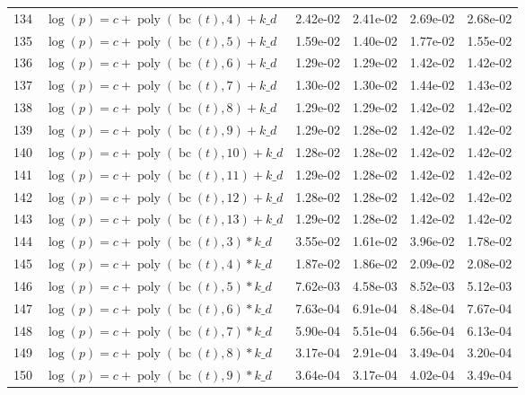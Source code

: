 \documentclass[12pt,a4paper]{article}
\DeclareMathOperator{\bc}{bc}
\DeclareMathOperator{\poly}{poly}
\begin{document}
\begin{longtable}[t]{ll>{\raggedleft\arraybackslash}p{2cm}>{\raggedleft\arraybackslash}p{2cm}>{\raggedleft\arraybackslash}p{2cm}>{\raggedleft\arraybackslash}p{2cm}}
134 & $\log(p) = c + \poly\left( \bc(t), 4 \right) + k\_d$ & 2.42e-02 & 2.41e-02 & 2.69e-02 & 2.68e-02\\
\rowcolor{gray!6}  135 & $\log(p) = c + \poly\left( \bc(t), 5 \right) + k\_d$ & 1.59e-02 & 1.40e-02 & 1.77e-02 & 1.55e-02\\
136 & $\log(p) = c + \poly\left( \bc(t), 6 \right) + k\_d$ & 1.29e-02 & 1.29e-02 & 1.42e-02 & 1.42e-02\\
\rowcolor{gray!6}  137 & $\log(p) = c + \poly\left( \bc(t), 7 \right) + k\_d$ & 1.30e-02 & 1.30e-02 & 1.44e-02 & 1.43e-02\\
138 & $\log(p) = c + \poly\left( \bc(t), 8 \right) + k\_d$ & 1.29e-02 & 1.29e-02 & 1.42e-02 & 1.42e-02\\
\rowcolor{gray!6}  139 & $\log(p) = c + \poly\left( \bc(t), 9 \right) + k\_d$ & 1.29e-02 & 1.28e-02 & 1.42e-02 & 1.42e-02\\
140 & $\log(p) = c + \poly\left( \bc(t), 10 \right) + k\_d$ & 1.28e-02 & 1.28e-02 & 1.42e-02 & 1.42e-02\\
\rowcolor{gray!6}  141 & $\log(p) = c + \poly\left( \bc(t), 11 \right) + k\_d$ & 1.29e-02 & 1.28e-02 & 1.42e-02 & 1.42e-02\\
142 & $\log(p) = c + \poly\left( \bc(t), 12 \right) + k\_d$ & 1.28e-02 & 1.28e-02 & 1.42e-02 & 1.42e-02\\
\rowcolor{gray!6}  143 & $\log(p) = c + \poly\left( \bc(t), 13 \right) + k\_d$ & 1.29e-02 & 1.28e-02 & 1.42e-02 & 1.42e-02\\
144 & $\log(p) = c + \poly\left( \bc(t), 3 \right) * k\_d$ & 3.55e-02 & 1.61e-02 & 3.96e-02 & 1.78e-02\\
\rowcolor{gray!6}  145 & $\log(p) = c + \poly\left( \bc(t), 4 \right) * k\_d$ & 1.87e-02 & 1.86e-02 & 2.09e-02 & 2.08e-02\\
146 & $\log(p) = c + \poly\left( \bc(t), 5 \right) * k\_d$ & 7.62e-03 & 4.58e-03 & 8.52e-03 & 5.12e-03\\
\rowcolor{gray!6}  147 & $\log(p) = c + \poly\left( \bc(t), 6 \right) * k\_d$ & 7.63e-04 & 6.91e-04 & 8.48e-04 & 7.67e-04\\
148 & $\log(p) = c + \poly\left( \bc(t), 7 \right) * k\_d$ & 5.90e-04 & 5.51e-04 & 6.56e-04 & 6.13e-04\\
\rowcolor{gray!6}  149 & $\log(p) = c + \poly\left( \bc(t), 8 \right) * k\_d$ & 3.17e-04 & 2.91e-04 & 3.49e-04 & 3.20e-04\\
150 & $\log(p) = c + \poly\left( \bc(t), 9 \right) * k\_d$ & 3.64e-04 & 3.17e-04 & 4.02e-04 & 3.49e-04\\

\end{longtable}
\end{document}
